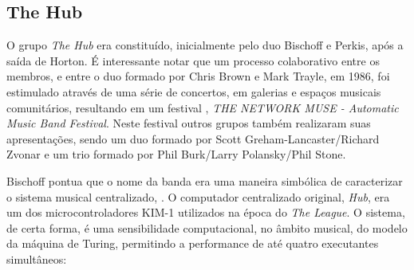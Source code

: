 \subsection{The Hub}

O grupo \emph{The Hub} era constituído, inicialmente pelo duo Bischoff e Perkis, após a saída de Horton. É interessante notar que um processo colaborativo entre os membros, e entre o duo formado por Chris Brown e Mark Trayle, em 1986, foi estimulado através de  uma série de concertos, em galerias e espaços musicais comunitários, resultando em um festival , \emph{THE NETWORK MUSE - Automatic Music Band Festival}. Neste festival outros grupos também realizaram suas apresentações, sendo um duo formado por Scott Greham-Lancaster/Richard Zvonar e um trio formado por Phil Burk/Larry Polansky/Phil Stone.

Bischoff pontua que o nome da banda era uma maneira simbólica de caracterizar o sistema musical centralizado, . O computador centralizado original, \emph{Hub}, era um dos microcontroladores KIM-1 utilizados na época do \emph{The League}. O sistema, de certa forma, é uma sensibilidade computacional, no âmbito musical, do modelo da máquina de Turing, permitindo a performance de até quatro executantes simultâneos:  


